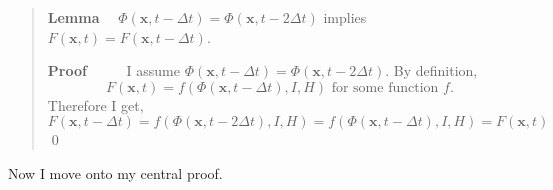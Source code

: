 \begin{quote}
\textbf{Lemma} \ \
$\Phi \left({\mathbf x},t-\Delta t\right)=\Phi \left({\mathbf x},t-2\Delta t\right)$ implies $F\left({\mathbf x},t\right)=F\left({\mathbf x},t-\Delta t\right)$.

\textbf{Proof} \ \ \ \ \ I assume $\Phi \left({\mathbf x},t-\Delta t\right)=\Phi \left({\mathbf x},t-2\Delta t\right)$. By definition,
\begin{equation}
F\left({\mathbf x},t\right)=f(\Phi \left({\mathbf x},t-\Delta t\right),I,H) \mbox{ for some function } f.
\end{equation}
Therefore I get,
\begin{equation}
F\left({\mathbf x},t-\Delta t\right)=f\left(\Phi \left({\mathbf x},t-2\Delta t\right),I,H\right)=f\left(\Phi \left({\mathbf x},t-\Delta t\right),I,H\right)=F\left({\mathbf x},t\right)
\end{equation}
\qed
\end{quote}

\medskip

\medskip

\medskip

\medskip

Now I move onto my central proof.

\medskip

\medskip

\medskip

\medskip

